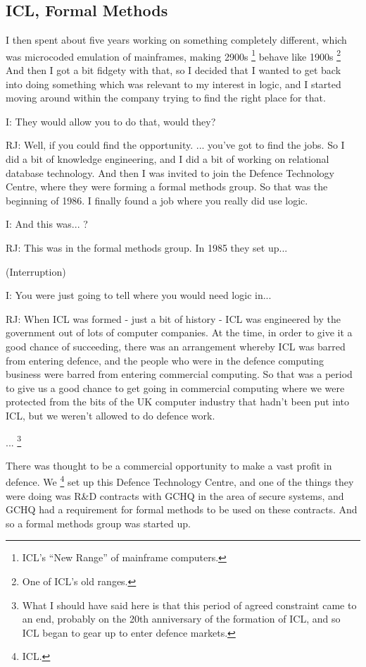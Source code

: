 \documentclass[10pt,titlepage]{book}
\begin{document}
\subsection{ICL, Formal Methods}

I then spent about five years working on something completely different, which was microcoded emulation of mainframes, making 2900s%
\footnote{
ICL's ``New Range'' of mainframe computers.
}
behave like 1900s%
\footnote{
One of ICL's old ranges.
}
And then I got a bit fidgety with that, so I decided that I wanted to get back into doing something which was relevant to my interest in logic, and I started moving around within the company trying to find the right place for that.

I: They would allow you to do that, would they?

RJ: Well, if you could find the opportunity.
... you've got to find the jobs.
So I did a bit of knowledge engineering, and I did a bit of working on relational database technology.
And then I was invited to join the Defence Technology Centre, where they were forming a formal methods group.
So that was the beginning of 1986. I finally found a job where you really did use logic.

I: And this was... ?

RJ: This was in the formal methods group. In 1985 they set up...

(Interruption)

I: You were just going to tell where you would need logic in...

RJ: 
When ICL was formed - just a bit of history - ICL was engineered by the government out of lots of computer companies.
At the time, in order to give it a good chance of succeeding, there was an arrangement whereby ICL was barred from entering defence, and the people who were in the defence computing business were barred from entering commercial computing.
So that was a period to give us a good chance to get going in commercial computing where we were protected from the bits of the UK computer industry that hadn't been put into ICL, but we weren't allowed to do defence work.

...%
\footnote{
What I should have said here is that this period of agreed constraint came to an end, probably on the 20th anniversary of the formation of ICL, and so ICL began to gear up to enter defence markets.
}

There was thought to be a commercial opportunity to make a vast profit in defence.
We%
\footnote{
ICL.
}%
 set up this Defence Technology Centre, and one of the things they were doing was R\&D contracts with GCHQ in the area of secure systems, and GCHQ had a requirement for formal methods to be used on these contracts.
And so a formal methods group was started up.
\end{document}
